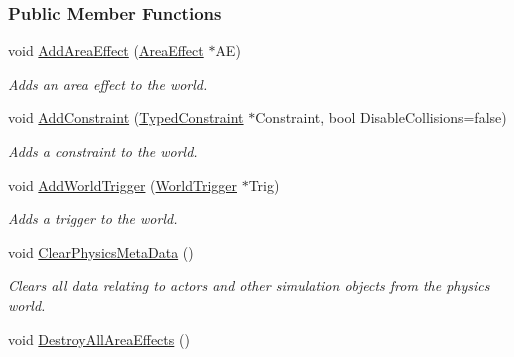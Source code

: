 \subsubsection*{Public Member Functions}
\begin{DoxyCompactItemize}
\item 
void \hyperlink{classphys_1_1PhysicsManager_a64e75a71598b6440c4feb1a2214a1420}{AddAreaEffect} (\hyperlink{classphys_1_1AreaEffect}{AreaEffect} $\ast$AE)
\begin{DoxyCompactList}\small\item\em Adds an area effect to the world. \item\end{DoxyCompactList}\item 
void \hyperlink{classphys_1_1PhysicsManager_aa2e58b40c1031c777d828b2409befbb9}{AddConstraint} (\hyperlink{classphys_1_1TypedConstraint}{TypedConstraint} $\ast$Constraint, bool DisableCollisions=false)
\begin{DoxyCompactList}\small\item\em Adds a constraint to the world. \item\end{DoxyCompactList}\item 
void \hyperlink{classphys_1_1PhysicsManager_abed0578d971b6df80120a0a5fcc4a1d9}{AddWorldTrigger} (\hyperlink{classphys_1_1WorldTrigger}{WorldTrigger} $\ast$Trig)
\begin{DoxyCompactList}\small\item\em Adds a trigger to the world. \item\end{DoxyCompactList}\item 
void \hyperlink{classphys_1_1PhysicsManager_aa9f964240e51a92abf0afbb045721396}{ClearPhysicsMetaData} ()
\begin{DoxyCompactList}\small\item\em Clears all data relating to actors and other simulation objects from the physics world. \item\end{DoxyCompactList}\item 
\hypertarget{classphys_1_1PhysicsManager_ac0157bc0c953b13162c680d1c49980f6}{
void \hyperlink{classphys_1_1PhysicsManager_ac0157bc0c953b13162c680d1c49980f6}{DestroyAllAreaEffects} ()}
\label{classphys_1_1PhysicsManager_ac0157bc0c953b13162c680d1c49980f6}


\end{DoxyCompactItemize}
